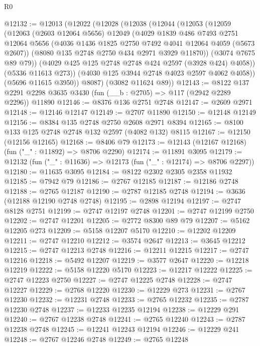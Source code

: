 \begin{lexlean}{R0}
\begin{coremodule}
@12132 := @12013
    (@12022
      (@12028
        (@12038
          (@12044
            (@12053
              (@12059
                (@12063
                  (@2603 @12064 @5656)
                  @12049
                  (@4029
                    @1839
                    @486
                    @7493
                    @2751
                    @12064
                    @5656
                    (@4036 @1436 @1825 @2750 @7492 @4041 @12064 @4059 (@5673 @2607))
                    (@8080 @135 @2748 @2750 @434 @2971 @3929 @11870))
                  (@3074 @7675 @89 @79))
                (@4029 @425 @125 @2748 @2748 @424 @2597 (@3928 @424) @4058))
              (@5336 @11613 @273))
            (@4030 @125 @3944 @2748 @4023 @2597 @4062 @4058))
          (@5696 @11615 @3950))
        @8087)
      (@3082 @11624 @89))
@12143 := @8122 @137 @2291 @2298 @3635 @3430 (fun (__b : @2705) => @117 (@2942 @2289 @2296)) @11890
@12146 := @8376 @136 @2751 @2748
@12147 := @2609 @2971
@12148 := @12146 @12147
@12149 := @2707 @11890
@12150 := @12148 @12149
@12156 := @8384 @135 @2748 @2750 @2608 @2971 @8394
@12165 := @8100 @133 @125 @2748 @2748 @132 @2597 (@4082 @132) @8115
@12167 := @12150 (@12156 @12165)
@12168 := @8406 @79
@12173 := @12143 (@12167 @12168) (fun ("_" : @11892) => @8706 @2290)
@12174 := @11891 @3095
@12179 := @12132 (fun ("_" : @11636) => @12173 (fun ("_" : @12174) => @8706 @2297))
@12180 := @11635 @3095
@12184 := @8122 @2302 @2305 @2358 @11932
@12185 := @7942 @79
@12186 := @2767 @12185
@12187 := @12186 @2748
@12188 := @2765 @12187
@12190 := @2787 @12185 @2748
@12194 := @3636 (@12188 @12190 @2748 @2748)
@12195 := @2898 @12194
@12197 := @2747 @8128 @2751
@12199 := @2747 @12197 @2748
@12201 := @2747 @12199 @2750
@12202 := @2747 @12201
@12205 := @2772 @8300 @89 @79
@12207 := @5162 @12205 @273
@12209 := @5158 @12207 @5170
@12210 := @12202 @12209
@12211 := @2747 @12210
@12212 := @3574 @2647
@12213 := @3645 @12212
@12215 := @2747 @12213 @2748
@12216 := @12211 @12215
@12217 := @2747 @12216
@12218 := @5492 @12207
@12219 := @3577 @2647
@12220 := @12218 @12219
@12222 := @5158 @12220 @5170
@12223 := @12217 @12222
@12225 := @2747 @12223 @2750
@12227 := @2747 @12225 @2748
@12228 := @2747 @12227
@12229 := @2768 @12220
@12230 := @12229 @273
@12231 := @2767 @12230
@12232 := @12231 @2748
@12233 := @2765 @12232
@12235 := @2787 @12230 @2748
@12237 := @12233 @12235 @12194
@12238 := @12229 @291
@12240 := @2767 @12238 @2748
@12241 := @2765 @12240
@12243 := @2787 @12238 @2748
@12245 := @12241 @12243 @12194
@12246 := @12229 @241
@12248 := @2767 @12246 @2748
@12249 := @2765 @12248

\end{coremodule}
\end{lexlean}
